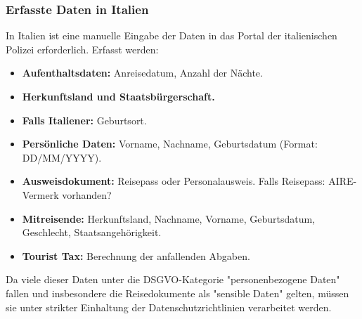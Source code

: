    \subsubsection{Erfasste Daten in Italien}
    In Italien ist eine manuelle Eingabe der Daten in das Portal der italienischen Polizei erforderlich. Erfasst werden:
    \begin{itemize}
        \item \textbf{Aufenthaltsdaten:} Anreisedatum, Anzahl der Nächte.
        \item \textbf{Herkunftsland und Staatsbürgerschaft.}
        \item \textbf{Falls Italiener:} Geburtsort.
        \item \textbf{Persönliche Daten:} Vorname, Nachname, Geburtsdatum (Format: DD/MM/YYYY).
        \item \textbf{Ausweisdokument:} Reisepass oder Personalausweis. Falls Reisepass: AIRE-Vermerk vorhanden?
        \item \textbf{Mitreisende:} Herkunftsland, Nachname, Vorname, Geburtsdatum, Geschlecht, Staatsangehörigkeit.
        \item \textbf{Tourist Tax:} Berechnung der anfallenden Abgaben.
    \end{itemize}
    
    Da viele dieser Daten unter die DSGVO-Kategorie "personenbezogene Daten" fallen und insbesondere die Reisedokumente als "sensible Daten" gelten, müssen sie unter strikter Einhaltung der Datenschutzrichtlinien verarbeitet werden.
